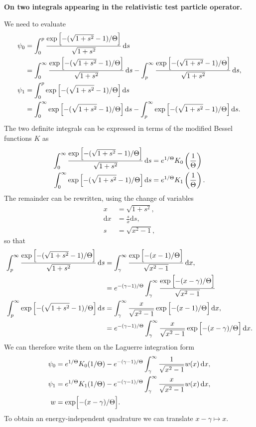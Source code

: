 \documentclass[11pt,a4paper]{article}
\newcommand{\rd}{\ensuremath{\mathrm{d}}}
\begin{document}
\begin{center}
\Large \bf On two integrals appearing in the relativistic test particle operator.
\end{center}

We need to evaluate
\begin{align}
\psi_0 &= \int_0^p \frac{\exp{\Bigl[-(\sqrt{1+s^2}-1)/\Theta\Bigr]}}{\sqrt{1+s^2}} \, \rd s \nonumber \\
&= \int_0^\infty \frac{\exp{\Bigl[-(\sqrt{1+s^2}-1)/\Theta\Bigr]}}{\sqrt{1+s^2}} \, \rd s  - \int_p^\infty \frac{\exp{\Bigl[-(\sqrt{1+s^2}-1)/\Theta\Bigr]}}{\sqrt{1+s^2}} \, \rd s, \nonumber \\
\psi_1 &= \int_0^p \exp{\Bigl[-(\sqrt{1+s^2}-1)/\Theta\Bigr]} \, \rd s \nonumber \\
&= \int_0^\infty \exp{\Bigl[-(\sqrt{1+s^2}-1)/\Theta\Bigr]} \, \rd s  - \int_p^\infty \exp{\Bigl[-(\sqrt{1+s^2}-1)/\Theta\Bigr]} \, \rd s.
\end{align}
The two definite integrals can be expressed in terms of the modified Bessel functions $K$ as
\begin{align}
\int_0^\infty \frac{\exp{\Bigl[-(\sqrt{1+s^2}-1)/\Theta\Bigr]}}{\sqrt{1+s^2}} \, \rd s &=  e^{1/\Theta}K_0\left(\frac{1}{\Theta}\right) \nonumber \\
\int_0^\infty \exp{\Bigl[-(\sqrt{1+s^2}-1)/\Theta\Bigr]} \, \rd s   &= e^{1/\Theta}K_1\left(\frac{1}{\Theta}\right).
\end{align}
The remainder can be rewritten, using the change of variables
\begin{align}
x &= \sqrt{1+s^2}, \nonumber \\
\rd x &= \frac{s}{x}\rd s, \nonumber \\
s &= \sqrt{x^2-1},
\end{align}
so that
\begin{align}
\int_p^\infty \frac{\exp{\Bigl[-(\sqrt{1+s^2}-1)/\Theta\Bigr]}}{\sqrt{1+s^2}} \, \rd s &= \int_\gamma^\infty \frac{\exp{\Bigl[-(x-1)/\Theta\Bigr]}}{\sqrt{x^2-1}} \, \rd x, \nonumber \\
&= e^{-(\gamma-1)/\Theta}   \int_\gamma^\infty \frac{\exp{\Bigl[-(x-\gamma)/\Theta\Bigr]}}{\sqrt{x^2-1}} \nonumber \\
\int_p^\infty \exp{\Bigl[-(\sqrt{1+s^2}-1)/\Theta\Bigr]} \, \rd s &= \int_\gamma^\infty \frac{x}{\sqrt{x^2-1}}\exp{\Bigl[-(x-1)/\Theta\Bigr]} \, \rd x, \nonumber \\
&= e^{-(\gamma-1)/\Theta}\int_\gamma^\infty \frac{x}{\sqrt{x^2-1}}\exp{\Bigl[-(x-\gamma)/\Theta\Bigr]} \, \rd x.
\end{align}
We can therefore write them on the Laguerre integration form
\begin{align}
\psi_0 &= e^{1/\Theta}K_0(1/\Theta) - e^{-(\gamma-1)/\Theta} \int_\gamma^\infty \frac{1}{\sqrt{x^2-1}} w(x) \, \rd x , \nonumber \\
\psi_1 &= e^{1/\Theta}K_1(1/\Theta) - e^{-(\gamma-1)/\Theta} \int_\gamma^\infty \frac{x}{\sqrt{x^2-1}} w(x) \, \rd x , \nonumber \\
w &= \exp\Bigl[-(x-\gamma)/\Theta\Bigr].
\end{align}
To obtain an energy-independent quadrature we can translate $x-\gamma \mapsto x$.
\end{document}
